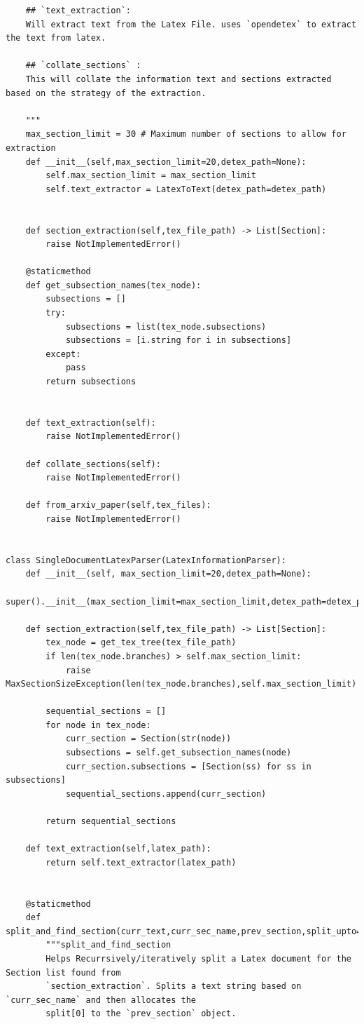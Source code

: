 \begin{lstlisting}
    ## `text_extraction`:
    Will extract text from the Latex File. uses `opendetex` to extract the text from latex. 

    ## `collate_sections` : 
    This will collate the information text and sections extracted based on the strategy of the extraction. 

    """
    max_section_limit = 30 # Maximum number of sections to allow for extraction
    def __init__(self,max_section_limit=20,detex_path=None):
        self.max_section_limit = max_section_limit
        self.text_extractor = LatexToText(detex_path=detex_path)

    
    def section_extraction(self,tex_file_path) -> List[Section]:
        raise NotImplementedError()
    
    @staticmethod
    def get_subsection_names(tex_node):
        subsections = []
        try:
            subsections = list(tex_node.subsections)
            subsections = [i.string for i in subsections]
        except:
            pass
        return subsections            


    def text_extraction(self):
        raise NotImplementedError()

    def collate_sections(self):
        raise NotImplementedError()

    def from_arxiv_paper(self,tex_files):
        raise NotImplementedError()


class SingleDocumentLatexParser(LatexInformationParser):
    def __init__(self, max_section_limit=20,detex_path=None):
        super().__init__(max_section_limit=max_section_limit,detex_path=detex_path)
    
    def section_extraction(self,tex_file_path) -> List[Section]:
        tex_node = get_tex_tree(tex_file_path)
        if len(tex_node.branches) > self.max_section_limit:
            raise MaxSectionSizeException(len(tex_node.branches),self.max_section_limit)
        
        sequential_sections = []
        for node in tex_node:
            curr_section = Section(str(node))
            subsections = self.get_subsection_names(node)
            curr_section.subsections = [Section(ss) for ss in subsections]
            sequential_sections.append(curr_section)

        return sequential_sections
    
    def text_extraction(self,latex_path):
        return self.text_extractor(latex_path)

            
    @staticmethod
    def split_and_find_section(curr_text,curr_sec_name,prev_section,split_upto=0.2,split_bins=10):
        """split_and_find_section 
        Helps Recurrsively/iteratively split a Latex document for the Section list found from 
        `section_extraction`. Splits a text string based on `curr_sec_name` and then allocates the 
        split[0] to the `prev_section` object. 
        

\end{lstlisting}
